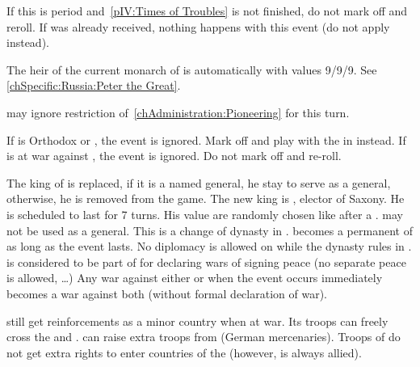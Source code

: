 

\condition{}
\aparag If this is period  and~\ref{pIV:Times of Troubles} is not
finished, do not mark off and reroll.
\aparag If  was already received, nothing happens
  with this event (do not apply \RD instead).

\phevnt
\aparag The heir of the current monarch of \RUS is automatically
 with values 9/9/9. See \ref{chSpecific:Russia:Peter
  the Great}.

\phadm
\aparag \RUS may ignore restriction of~\ref{chAdministration:Pioneering} for
this turn.





\condition{}
\aparag If \POL is Orthodox or \CATHCR, the event is ignored. Mark off and
play \RD with the \REVOLT in \POL instead.
\aparag If \POL is at war against \paysSaxe, the event is ignored. Do not mark
off and re-roll.

\phevnt
\aparag The king of \POL is replaced, if it is a named general, he stay to
serve \POL as a general, otherwise, he is removed from the game. The new king
is , elector of Saxony.
\bparag He is scheduled to last for 7 turns.
\bparag His value are randomly chosen like after a .
\bparag {} may not be used as a general.
\bparag This is a change of dynasty in \POL.
\aparag \paysSaxe becomes a permanent \VASSAL of \POL as long as the event
lasts.
\bparag No diplomacy is allowed on \paysSaxe while the dynasty rules in \POL.
\bparag \paysSaxe is considered to be part of \POL for declaring wars of
signing peace (no separate peace is allowed, \ldots)
\aparag Any war against either \paysSaxe or \POL when the event occurs
immediately becomes a war against both (without formal declaration of war).

\phadm
\aparag \paysSaxe still get reinforcements as a minor country when at war. Its
troops can freely cross the \HRE and \POL. \POL can raise extra troops from
\paysSaxe (German mercenaries).
\aparag Troops of \POL do not get extra rights to enter countries of the \HRE
(however, \paysSaxe is always allied).
%

